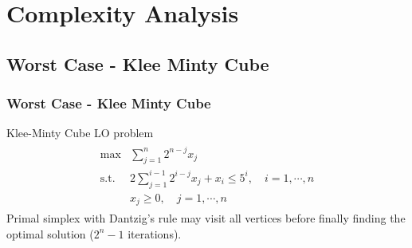 \documentclass{beamer}
\begin{document}
\section{Complexity Analysis}
\subsection{Worst Case - Klee Minty Cube}
\begin{frame}
\frametitle{Worst Case - Klee Minty Cube}
Klee-Minty Cube LO problem
\begin{align*}
\begin{split}
\max &\sum_{j=1}^n 2^{n-j}x_j \\
\text{s.t. } & 2\sum_{j=1}^{i-1}2^{i-j}x_j + x_i \le 5^i, \quad i=1,\cdots,n\\
			&x_j \ge 0,  \quad j=1,\cdots,n
\end{split}
\end{align*} 
Primal simplex with Dantzig's rule may visit all vertices before finally finding the optimal solution ($2^n - 1$ iterations).
\end{frame}
\end{document}
